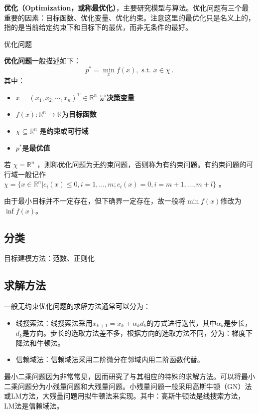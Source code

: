 
\begin{issues}
\issueDraft
\end{issues}


\textbf{优化（Optimization，或称最优化）}，主要研究模型与算法。优化问题有三个最重要的因素：目标函数、优化变量、优化约束。注意这里的最优化只是名义上的，指的是当前给定约束下和目标下的最优，而非无条件的最好。

\begin{definition}{优化问题}

\textbf{优化问题}一般描述如下：
\begin{equation}
p^*=\min _x f(x),\text{ s.t. } x\in \chi ~.
\end{equation}
其中：
\begin{itemize}
\item $x=(x_1,x_2,\cdots,x_n)^\text{T}\in\mathbb{R}^n$ 是\textbf{决策变量}
\item $f(x):\mathbb{R}^n\rightarrow\mathbb{R}$为\textbf{目标函数}
\item $\chi\subseteq\mathbb{R}^n$ 是\textbf{约束}或\textbf{可行域}
\item $p^*$是\textbf{最优值}
\end{itemize}
\end{definition}

若 $\chi=\mathbb{R}^n$ ，则称优化问题为无约束问题，否则称为有约束问题。有约束问题的可行域一般记作$\chi=\{x\in \mathbb{R}^n|c_i(x)\le 0,i=1,\dots,m;c_i(x)=0,i=m+1,\dots,m+l\}$ 。

由于最小目标并不一定存在，但下确界一定存在，故一般将$\min f(x)$修改为$\inf f(x)$。

\subsection{分类}

目标建模方法：范数、正则化

\subsection{求解方法}

一般无约束优化问题的求解方法通常可以分为：

\begin{itemize}
\item 线搜索法：线搜索法采用$x_{k+1}=x_k+\alpha_k d_k$的方式进行迭代，其中$\alpha_k$是步长，$d_k$是方向。步长的选取方法差不多，根据方向的选取方法不同，分为：梯度下降法和牛顿法。
\item 信赖域法：信赖域法采用二阶微分在邻域内用二阶函数代替。
\end{itemize}

最小二乘问题因为非常常见，因而研究了与其相应的特殊的求解方法。可以将最小二乘问题分为小残量问题和大残量问题。小残量问题一般采用高斯牛顿（GN）法或LM方法，大残量问题用拟牛顿法来实现。其中：高斯牛顿法是线搜索方法，LM法是信赖域法。